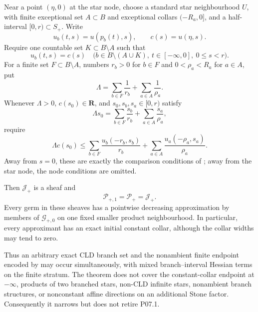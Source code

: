 \begin{theorem}
Near a point $(\eta,0)$ at the star node, choose a standard star
neighbourhood $U$, with finite exceptional set $A\subset B$ and
exceptional collars $(-R_a,0]$, and a half-interval $[0,r)\subset S_+$.
Write
\[
             u_b(t,s)=u(p_b(t),s),\qquad c(s)=u(\eta,s).
\]
Require one countable set $K\subset B\setminus A$ such that
\begin{equation}
 u_b(t,s)=c(s)
 \quad
 \bigl(b\in B\setminus(A\cup K),\ t\in[-\infty,0],\
       0\leq s<r\bigr).
\label{eq:p071-star-finite-collar-countable-activity}
\end{equation}
For a finite set $F\subset B\setminus A$, numbers $r_b>0$ for $b\in F$
and $0<\rho_a<R_a$ for $a\in A$, put
\[
          \Lambda=\sum_{b\in F}\frac1{r_b}
                    +\sum_{a\in A}\frac1{\rho_a}.
\]
Whenever $\Lambda>0$, $c(s_0)\in\mathbf R$, and
$s_0,s_b,s_a\in[0,r)$ satisfy
\begin{equation}
 \Lambda s_0=
       \sum_{b\in F}\frac{s_b}{r_b}
        +\sum_{a\in A}\frac{s_a}{\rho_a},
\label{eq:p071-star-finite-collar-barycentre}
\end{equation}
require
\begin{equation}
 \Lambda c(s_0)\leq
       \sum_{b\in F}\frac{u_b(-r_b,s_b)}{r_b}
        +\sum_{a\in A}\frac{u_a(-\rho_a,s_a)}{\rho_a}.
\label{eq:p071-star-finite-collar-jensen}
\end{equation}
Away from $s=0$, these are exactly the comparison conditions of
; away from the star node,
the node conditions are omitted.

Then $\mathcal J_+$ is a sheaf and
\begin{equation}
                  \mathcal P_{+,1}=\mathcal P_+=\mathcal J_+.
\label{eq:p071-star-finite-collar-collapse}
\end{equation}
Every germ in these sheaves has a pointwise decreasing approximation by
members of $\mathcal G_{+,0}$ on one fixed smaller product neighbourhood.
In particular, every approximant has an exact initial constant collar,
although the collar widths may tend to zero.

Thus an arbitrary exact CLD branch set and the nonambient finite endpoint
encoded by \Cref{thm:p071-cld-constant-collar-endpoint} may occur
simultaneously, with mixed
branch--interval Hessian terms on the finite stratum.  The theorem does not
cover the constant-collar endpoint at $-\infty$, products of two branched
stars, non-CLD infinite stars, nonambient branch structures, or nonconstant
affine directions on an additional Stone factor.  Consequently it narrows
but does not retire P07.1.
\end{theorem}

